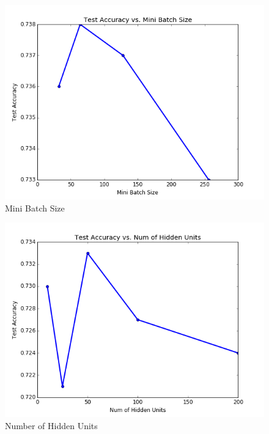 \documentclass[paper=a4, fontsize=11pt]{scrartcl}
\begin{document}
\begin{figure}
\centering
 \begin{minipage}{.5\textwidth}
 \centering
  	\includegraphics[width=1\linewidth]{batchsize.png}
  	\footnotesize{Mini Batch Size}
 \end{minipage}%
 \centering
 \begin{minipage}{.5\textwidth}
 \centering
  	\includegraphics[width=1\linewidth]{hiddenunits.png}
  	\footnotesize{Number of Hidden Units}
 \end{minipage}
  \centering
 \begin{minipage}{.5\textwidth}
 \centering

\end{minipage}
\end{figure}
\end{document}
